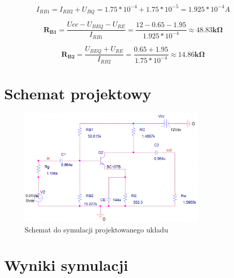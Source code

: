 \documentclass[a4paper,12pt]{article}
\begin{document}
\begin{itemize}
\begin{equation}
I_{RB1} = I_{RB2} + U_{BQ} = 1.75*10^{-4} + 1.75*10^{-5} = 1.925*10^{-4}A
\end{equation}

\begin{equation}
\mathbf{R_{B1}} = \frac{Ucc - U_{BEQ} - U_{RE}}{I_{RB1}} = \frac{12 - 0.65 - 1.95}{ 1.925*10^{-4}} \approx \mathbf{48.83k\Omega}
\end{equation}

\begin{equation}
\mathbf{R_{B2}} = \frac{U_{BEQ} + U_{RE}}{I_{RB2}} = \frac{0.65 + 1.95}{1.75*10^{-4}} \approx \mathbf{14.86k\Omega}
\end{equation}

\end{itemize}

\section {Schemat projektowy}
\begin{figure}[h]
  \center
  \includegraphics[width=0.8\textwidth]{schemat.png}
  \caption{Schemat do symulacji projektowanego układu}
\end{figure}

\newpage
\section{Wyniki symulacji}
\end{document}
